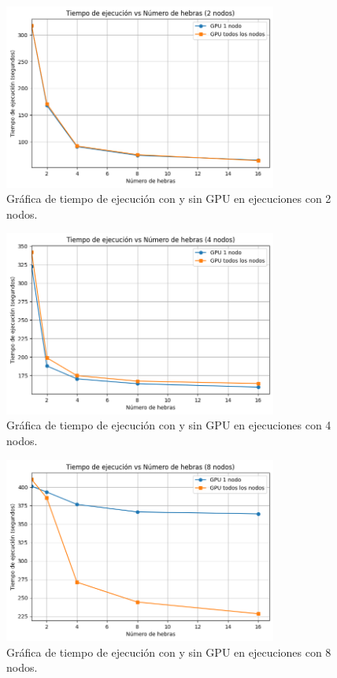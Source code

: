 \begin{figure}[ht]
    \centering
    \includegraphics[width=0.8\textwidth]{imagenes/cap5/exploratory_gpu_2nodes.png}
    \caption{Gráfica de tiempo de ejecución con y sin GPU en ejecuciones con 2 nodos.}
    \label{fig:exploratory_gpu_2nodes}
\end{figure}

\begin{figure}[ht]
    \centering
    \includegraphics[width=0.8\textwidth]{imagenes/cap5/exploratory_gpu_4nodes.png}
    \caption{Gráfica de tiempo de ejecución con y sin GPU en ejecuciones con 4 nodos.}
    \label{fig:exploratory_gpu_4nodes}
\end{figure}

\begin{figure}[ht]
    \centering
    \includegraphics[width=0.8\textwidth]{imagenes/cap5/exploratory_gpu_8nodes.png}
    \caption{Gráfica de tiempo de ejecución con y sin GPU en ejecuciones con 8 nodos.}
    \label{fig:exploratory_gpu_8nodes}
\end{figure}

